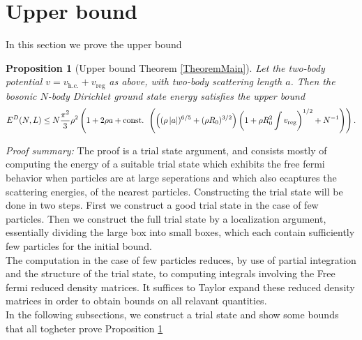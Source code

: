 \documentclass[a4paper,11pt]{article}
\newcommand{\abs}[1]{\left\lvert #1 \right\rvert}
\newtheorem{proposition}[theorem]{Proposition}
\numberwithin{equation}{section}
\begin{document}
	\section{Upper bound}
	In this section we prove the upper bound 
	\begin{proposition}[Upper bound Theorem \ref{TheoremMain}]
		\label{PropositionUpperBound}
		Let the two-body potential $ v=v_{\text{h.c.}}+v_{\text{reg}}$ as above, with two-body scattering length $ a $. Then the bosonic $ N $-body Dirichlet ground state energy satisfies the upper bound
		\begin{equation}
		E^D(N,L)\leq N\frac{\pi^2}{3}\rho^2\left(1+2\rho a + \textnormal{const. }\left(\left((\rho\abs{a})^{6/5}+(\rho R_0)^{3/2}\right)\left(1+\rho R_0^2 \int v_{\textnormal{reg}}\right)^{1/2}+N^{-1}\right)\right).
		\end{equation}
	\end{proposition}
	\textit{Proof summary:}
	The proof is a trial state argument, and consists mostly of computing the energy of a suitable trial state which exhibits the free fermi behavior when particles are at large seperations and which also ecaptures the scattering energies, of the nearest particles. Constructing the trial state will be done in two steps. First we construct a good trial state in the case of few particles. Then we construct the full trial state by a localization argument, essentially dividing the large box into small boxes, which each contain sufficiently few particles for the initial bound.\\
	 The computation in the case of few particles reduces, by use of partial integration and the structure of the trial state, to computing integrals involving the Free fermi reduced density matrices. It suffices to Taylor expand these reduced density matrices in order to obtain bounds on all relavant quantities.\\
	 In the following subsections, we construct a trial state and show some bounds that all togheter prove Proposition \ref{PropositionUpperBound} 
\end{document}

